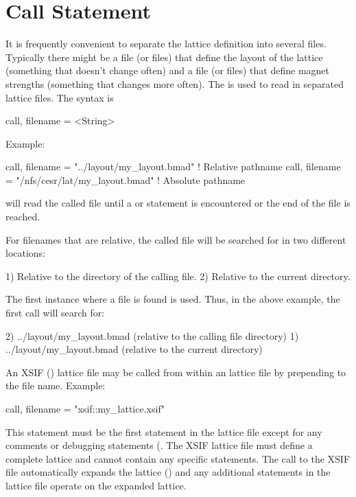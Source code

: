 {{%
\section{Call Statement}
\label{s:call}

It is frequently convenient to separate the lattice definition into
several files.  Typically there might be a file (or files) that define
the layout of the lattice (something that doesn't change often) and a
file (or files) that define magnet strengths (something that changes
more often).  The  is used to read in separated lattice
files. The syntax is
\begin{example}
  call, filename = <String>
\end{example}
Example:
\begin{example}
  call, filename = "../layout/my_layout.bmad"      ! Relative pathname
  call, filename = "/nfs/cesr/lat/my_layout.bmad"  ! Absolute pathname
\end{example}
\bmad will read the called file until a  or 
statement is encountered or the end of the file is reached.

For filenames that are relative, the called file will be searched for in
two different locations:
\begin{example}
  1) Relative to the directory of the calling file.
  2) Relative to the current directory.
\end{example}
The first instance where a file is found is used.
Thus, in the above example, the first call will search for:
\begin{example}
  2) ../layout/my_layout.bmad  (relative to the calling file directory)
  1) ../layout/my_layout.bmad  (relative to the current directory)
\end{example}

An XSIF () lattice file may be called
from within an \bmad lattice file by prepending  to the
file name. Example:
\begin{example}
  call, filename = "xsif::my_lattice.xsif"
\end{example}
This statement must be the first statement in the \bmad lattice file
except for any comments or debugging statements (. 
The XSIF lattice file must define a
complete lattice and cannot contain any \bmad specific statements. The
call to the XSIF file automatically expands the lattice
() and any additional statements in the \bmad lattice
file operate on the expanded lattice.

}}
